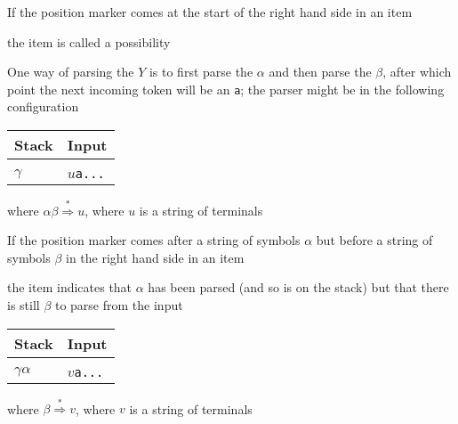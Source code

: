 \documentclass[8pt,a4paper,compress]{beamer}
\newcommand{\mm}[1]{$#1$}
\newcommand{\derives}{\stackrel{*}{\Rightarrow}}
\newenvironment{spaced}
{
\smallskip
\hspace{.5cm}
\begin{minipage}[c]{\textwidth}
}
{
\end{minipage}
\smallskip
}
\begin{document}
\begin{frame}[fragile]
\pause

If the position marker comes at the start of the right hand side in an item

\text{ }
\begin{spaced}
\begin{production}
[Y ::= \mm{\cdot \alpha \beta}, \lstinline{a}]
\end{production}
\end{spaced}

\noindent the item is called a possibility

\pause
\bigskip

One way of parsing the $Y$ is to first parse the $\alpha$ and then parse the $\beta$, after which point the next incoming token will be an \lstinline{a}; the parser might be in the following configuration

\begin{table}[H]
\begin{tabular}{ll}
Stack & Input \\ \hline \\
$\gamma$ & $u$\lstinline$a...$
\end{tabular}
\end{table}

\noindent where $\alpha \beta \derives u$, where $u$ is a string of terminals
\end{frame}

\begin{frame}[fragile]
\pause

If the position marker comes after a string of symbols $\alpha$ but before a string of symbols $\beta$ in the right hand side in an item

\text{ }
\begin{spaced}
\begin{production}
[Y ::= \mm{\alpha \cdot \beta}, \lstinline{a}]
\end{production}
\end{spaced}

\noindent the item indicates that $\alpha$ has been parsed (and so is on the stack) but that there is still $\beta$ to parse from the input

\begin{table}[H]
\begin{tabular}{ll}
Stack & Input \\ \hline \\
$\gamma \alpha$ & $v$\lstinline$a...$
\end{tabular}
\end{table}

\noindent where $\beta \derives v$, where $v$ is a string of terminals
\end{frame}
\end{document}
